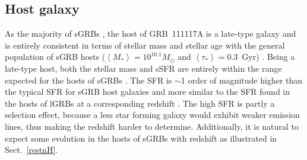 \documentclass{aa}    %
\begin{document}

\subsection{Host galaxy}

As the majority of sGRBs \citep{Fong2013b}, the host of GRB~111117A is a
late-type galaxy and is entirely consistent in terms of stellar mass and stellar
age with the general population of sGRB hosts ($\left\langle M _*
\right\rangle = 10^{10.1} M_{\odot}$ and $\left\langle \tau _* \right\rangle =
0.3 $~Gyr) \citep{Leibler2010}. Being a late-type host, both the stellar mass
and sSFR are entirely within the range expected for the hosts of sGRBs
\citep{Behroozi2014}. The SFR is $\sim$1 order of magnitude higher than the
typical SFR for sGRB host galaxies \citep{Berger2014} and more similar to
the SFR found in the hosts of lGRBs at a corresponding redshift
\citep{Kruhler2015}. The high SFR is partly a selection effect, because a less
star forming galaxy would exhibit weaker emission lines, thus making the
redshift harder to determine. Additionally, it is natural to expect some
evolution in the hosts of sGRBs with redshift as illustrated in Sect.~\ref{restnH}. 



\end{document}
